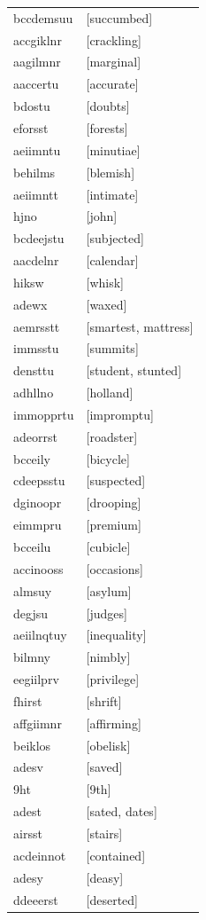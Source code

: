 \documentclass{article}
\begin{document}
\begin{tabular}{ll}
bccdemsuu & [succumbed] \\
accgiklnr & [crackling] \\
aagilmnr & [marginal] \\
aaccertu & [accurate] \\
bdostu & [doubts] \\
eforsst & [forests] \\
aeiimntu & [minutiae] \\
behilms & [blemish] \\
aeiimntt & [intimate] \\
hjno & [john] \\
bcdeejstu & [subjected] \\
aacdelnr & [calendar] \\
hiksw & [whisk] \\
adewx & [waxed] \\
aemrsstt & [smartest, mattress] \\
immsstu & [summits] \\
densttu & [student, stunted] \\
adhllno & [holland] \\
immopprtu & [impromptu] \\
adeorrst & [roadster] \\
bcceily & [bicycle] \\
cdeepsstu & [suspected] \\
dginoopr & [drooping] \\
eimmpru & [premium] \\
bcceilu & [cubicle] \\
accinooss & [occasions] \\
almsuy & [asylum] \\
degjsu & [judges] \\
aeiilnqtuy & [inequality] \\
bilmny & [nimbly] \\
eegiilprv & [privilege] \\
fhirst & [shrift] \\
affgiimnr & [affirming] \\
beiklos & [obelisk] \\
adesv & [saved] \\
9ht & [9th] \\
adest & [sated, dates] \\
airsst & [stairs] \\
acdeinnot & [contained] \\
adesy & [deasy] \\
ddeeerst & [deserted] \\

\end{tabular}
\end{document}
